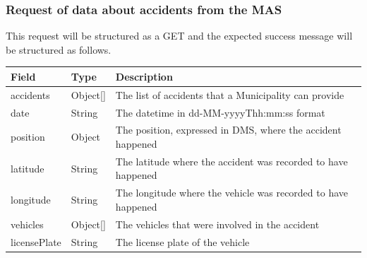 				\subsubsection{Request of data about accidents from the MAS}
				This request will be structured as a GET and the expected success message will be structured as follows.
					\begin{table}[!h]
						\begin{tabular}{L{0.23\textwidth}L{0.15\textwidth}L{0.42\textwidth}}
							\toprule
							\textbf{Field} & \textbf{Type} & \textbf{Description} \\
							\midrule
									accidents & Object[] & The list of accidents that a Municipality can provide \\
									\hspace{2.5mm}date & String & The datetime in \newline dd-MM-yyyyThh:mm:ss format \\
									\hspace{2.5mm}position & Object & The position, expressed in DMS, where the accident happened \\
									\hspace{5mm}latitude & String & The latitude where the accident was recorded to have happened \\
									\hspace{5mm}longitude & String & The longitude where the vehicle was recorded to have happened \\
									\hspace{2.5mm}vehicles & Object[] & The vehicles that were involved in the accident \\
									\hspace{5mm}licensePlate & String & The license plate of the vehicle \\
								 	\bottomrule
								\end{tabular}
							\end{table}
